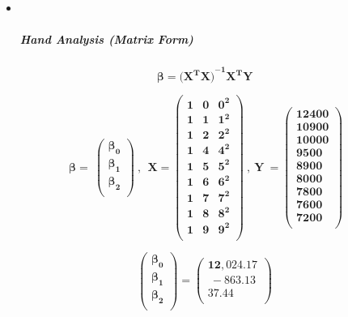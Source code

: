 \documentclass[
]{article}
\begin{document}
\begin{itemize}
\item ~
  \hypertarget{hand-analysis-matrix-form-4}{%
  \subparagraph{\texorpdfstring{\textbf{Hand Analysis (Matrix
  Form)}}{Hand Analysis (Matrix Form)}}\label{hand-analysis-matrix-form-4}}
\end{itemize}

\[\mathbf{\beta =}{\mathbf{(}\mathbf{X}^{\mathbf{T}}\mathbf{X)}}^{\mathbf{- 1}}\mathbf{X}^{\mathbf{T}}\mathbf{Y}\]

\[\mathbf{\ \beta = \ }\begin{pmatrix}
\mathbf{\beta}_{\mathbf{0}} \\
\mathbf{\beta}_{\mathbf{1}} \\
\mathbf{\beta}_{\mathbf{2}} \\
\end{pmatrix}\mathbf{\ }\mathbf{,\ \ X =}\begin{pmatrix}
\mathbf{1} & \mathbf{0} & \mathbf{0}^{\mathbf{2}} \\
\mathbf{1} & \mathbf{1} & \mathbf{1}^{\mathbf{2}} \\
\mathbf{1} & \mathbf{2} & \mathbf{2}^{\mathbf{2}} \\
\mathbf{1} & \mathbf{4} & \mathbf{4}^{\mathbf{2}} \\
\mathbf{1} & \mathbf{5} & \mathbf{5}^{\mathbf{2}} \\
\mathbf{1} & \mathbf{6} & \mathbf{6}^{\mathbf{2}} \\
\mathbf{1} & \mathbf{7} & \mathbf{7}^{\mathbf{2}} \\
\mathbf{1} & \mathbf{8} & \mathbf{8}^{\mathbf{2}} \\
\mathbf{1} & \mathbf{9} & \mathbf{9}^{\mathbf{2}} \\
\end{pmatrix}\mathbf{\ ,\ Y\  =}\begin{pmatrix}
\mathbf{12400} \\
\mathbf{10900} \\
\mathbf{10000} \\
\mathbf{9500} \\
\mathbf{8900} \\
\mathbf{8000} \\
\mathbf{7800} \\
\mathbf{7600} \\
\mathbf{7200} \\
\end{pmatrix}\]

\[\begin{pmatrix}
\mathbf{\beta}_{\mathbf{0}} \\
\mathbf{\beta}_{\mathbf{1}} \\
\mathbf{\beta}_{\mathbf{2}} \\
\end{pmatrix}\mathbf{=}\begin{pmatrix}
\mathbf{12,024.17} \\
\mathbf{\  - 863.13\ } \\
\mathbf{37.44} \\
\end{pmatrix}\]
\end{document}
